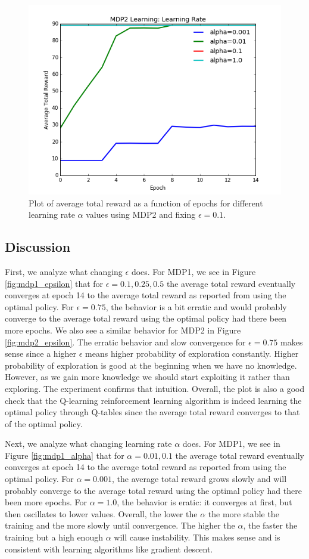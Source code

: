 \documentclass[paper=a4, fontsize=11pt]{scrartcl}
\begin{document}
\begin{figure}
\centering
	\includegraphics[width=.8\linewidth]{mdp2_alpha_plot.png}
\caption{Plot of average total reward as a function of epochs for different learning rate $\alpha$ values using MDP2 and fixing $\epsilon=0.1$.}
\label{fig:mdp2_alpha}
\end{figure}

\subsection{Discussion}

First, we analyze what changing $\epsilon$ does. For MDP1, we see in Figure \ref{fig:mdp1_epsilon} that for $\epsilon=0.1,0.25,0.5$ the average total reward eventually converges at epoch 14 to the average total reward as reported from using the optimal policy. For $\epsilon=0.75$, the behavior is a bit erratic and would probably converge to the average total reward using the optimal policy had there been more epochs. We also see a similar behavior for MDP2 in Figure \ref{fig:mdp2_epsilon}. The erratic behavior and slow convergence for $\epsilon=0.75$ makes sense since a higher $\epsilon$ means higher probability of exploration constantly.  Higher probability of exploration is good at the beginning when we have no knowledge. However, as we gain more knowledge we should start exploiting it rather than exploring. The experiment confirms that intuition. Overall, the plot is also a good check that the Q-learning reinforcement learning algorithm is indeed learning the optimal policy through Q-tables since the average total reward converges to that of the optimal policy.

Next, we analyze what changing learning rate $\alpha$ does. For MDP1, we see in Figure \ref{fig:mdp1_alpha} that for $\alpha=0.01, 0.1$ the average total reward eventually converges at epoch 14 to the average total reward as reported from using the optimal policy. For $\alpha=0.001$, the average total reward grows slowly and will probably converge to the average total reward using the optimal policy had there been more epochs. For $\alpha=1.0$, the behavior is eratic: it converges at first, but then oscillates to lower values. Overall, the lower the $\alpha$ the more stable the training and the more slowly until convergence. The higher the $\alpha$, the faster the training but a high enough $\alpha$ will cause instability. This makes sense and is consistent with learning algorithms like gradient descent.
\end{document}
